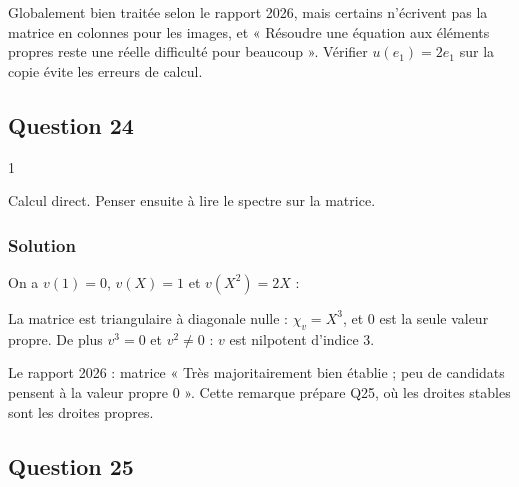 \documentclass[11pt,a4paper]{article}
\newcommand{\equationajustee}[1]{%
  \sbox{\boiteequation}{$\displaystyle #1$}%
  \ifdim\wd\boiteequation>\linewidth
    \[\resizebox{\linewidth}{!}{\usebox{\boiteequation}}\]%
  \else
    \[#1\]%
  \fi}
\begin{document}
\begin{jury}

Globalement bien traitée selon le rapport 2026, mais certains n'écrivent pas la matrice en colonnes pour les images, et « Résoudre une équation aux éléments propres reste une réelle difficulté pour beaucoup ». Vérifier \(u(e_1)=2e_1\) sur la copie évite les erreurs de calcul.

\end{jury}

\hypertarget{question-24}{%
\subsection{Question 24}\label{question-24}}

\begin{indication}{1}

Calcul direct. Penser ensuite à lire le spectre sur la matrice.

\end{indication}

\hypertarget{solution-23}{%
\subsubsection{Solution}\label{solution-23}}

On a \(v(1)=0\), \(v(X)=1\) et \(v(X^2)=2X\) :

\equationajustee{\boxed{{\mathrm{Mat}}_{\mathcal B_0}(v)=\begin{pmatrix}0&1&0\\0&0&2\\0&0&0\end{pmatrix}.}}

La matrice est triangulaire à diagonale nulle : \(\chi_v=X^3\), et \(0\) est la seule valeur propre. De plus \(v^3=0\) et \(v^2\neq0\) : \(v\) est nilpotent d'indice \(3\).

\begin{jury}

Le rapport 2026 : matrice « Très majoritairement bien établie ; peu de candidats pensent à la valeur propre 0 ». Cette remarque prépare Q25, où les droites stables sont les droites propres.

\end{jury}

\hypertarget{question-25}{%
\subsection{Question 25}\label{question-25}}
\end{document}
